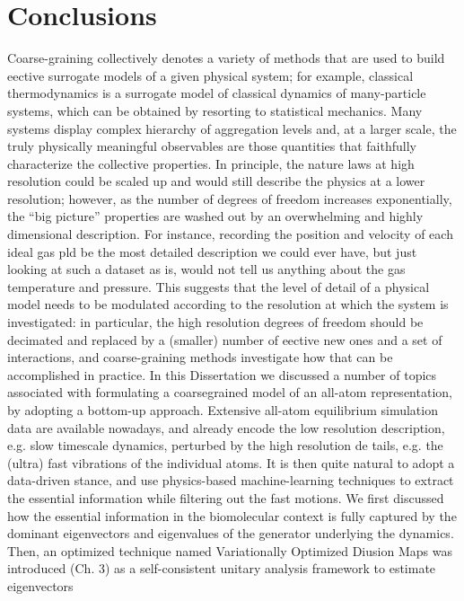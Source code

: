 \chapter{Conclusions}
%
Coarse-graining collectively denotes a variety of methods that are used to build eective
surrogate models of a given physical system; for example, classical thermodynamics is a
surrogate model of classical dynamics of many-particle systems, which can be obtained by
resorting to statistical mechanics.
Many systems display complex hierarchy of aggregation levels and, at a larger scale,
the truly physically meaningful observables are those quantities that faithfully characterize
the collective properties. In principle, the nature laws at high resolution could be scaled
up and would still describe the physics at a lower resolution; however, as the number of
degrees of freedom increases exponentially, the “big picture” properties are washed out by
an overwhelming and highly dimensional description. For instance, recording the position
and velocity of each ideal gas pld be the most detailed
description we could ever have, but just looking at such a dataset as is, would not tell us
anything about the gas temperature and pressure.
This suggests that the level of detail of a physical model needs to be modulated according
to the resolution at which the system is investigated: in particular, the high resolution
degrees of freedom should be decimated and replaced by a (smaller) number of eective
new ones and a set of interactions, and coarse-graining methods investigate how that can
be accomplished in practice.
In this Dissertation we discussed a number of topics associated with formulating a coarsegrained
model of an all-atom representation, by adopting a bottom-up approach. Extensive
all-atom equilibrium simulation data are available nowadays, and already encode the low
resolution description, e.g. slow timescale dynamics, perturbed by the high resolution de
tails, e.g. the (ultra) fast vibrations of the individual atoms. It is then quite natural to
adopt a data-driven stance, and use physics-based machine-learning techniques to extract
the essential information while filtering out the fast motions.
We first discussed how the essential information in the biomolecular context is fully
captured by the dominant eigenvectors and eigenvalues of the generator underlying the
dynamics. Then, an optimized technique named Variationally Optimized Diusion Maps
was introduced (Ch. 3) as a self-consistent unitary analysis framework to estimate eigenvectors
